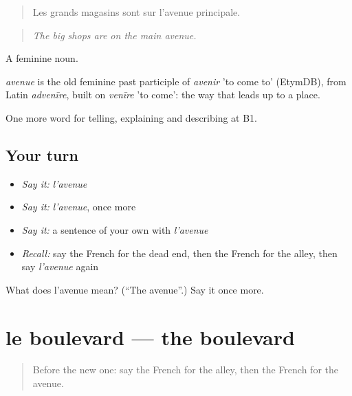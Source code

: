\begin{quote}
Les grands magasins sont sur l'avenue principale.
\end{quote}

\begin{quote}
\emph{The big shops are on the main avenue.}
\end{quote}

A feminine noun.

\begin{cousinweb}
\emph{avenue} is the old feminine past participle of \emph{avenir} 'to come to' (EtymDB), from Latin \emph{advenīre}, built on \emph{venīre} 'to come': the way that leads up to a place.
\end{cousinweb}

\begin{grammarlens}[title={What you've built}]
One more word for telling, explaining and describing at B1.
\end{grammarlens}

\subsection*{Your turn}
\begin{itemize}
\raggedright
  \item \emph{Say it:} \emph{l'avenue}
  \item \emph{Say it:} \emph{l'avenue}, once more
  \item \emph{Say it:} a sentence of your own with \emph{l'avenue}
  \item \emph{Recall:} say the French for the dead end, then the French for the alley, then say \emph{l'avenue} again
\end{itemize}

\begin{tcolorbox}[breakable,colback=teal!4,colframe=teal!35!black,title={Before you move on}]
What does l'avenue mean? (\textquotedblleft{}The avenue\textquotedblright{}.) Say it once more.
\end{tcolorbox}
\section[le boulevard]{le boulevard — the boulevard}

\label{lesson:FR-C437-boulevard}



\begin{quote}
Before the new one: say the French for the alley, then the French for the avenue.
\end{quote}

